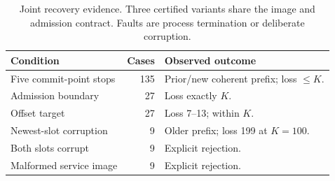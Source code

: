 \begin{table}[t]\caption{Joint recovery evidence. Three certified variants share the image and admission contract. Faults are process termination or deliberate corruption.}\label{tab:recoverycontracts}\centering
\begin{tabular}{@{}p{}rp{}@{}}\toprule
Condition & Cases & Observed outcome\\\midrule
Five commit-point stops & 135 & Prior/new coherent prefix; loss $\leq K$.\\
Admission boundary & 27 & Loss exactly $K$.\\
Offset target & 27 & Loss 7--13; within $K$.\\
Newest-slot corruption & 9 & Older prefix; loss 199 at $K=100$.\\
Both slots corrupt & 9 & Explicit rejection.\\
Malformed service image & 9 & Explicit rejection.\\\bottomrule
\end{tabular}\end{table}
